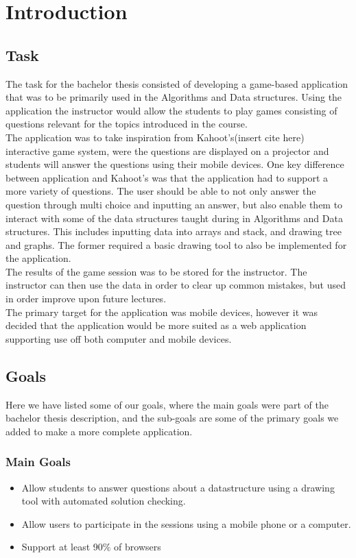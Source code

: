 \section{Introduction}
\subsection{Task}
The task for the bachelor thesis consisted of developing a game-based application that was to be primarily used in the Algorithms and Data structures. Using the application the instructor would allow the students to play games consisting of questions relevant for the topics introduced in the course.
\\[11pt]
The application was to take inspiration from Kahoot's(insert cite here) interactive game system, were the questions are displayed on a projector and students will answer the questions using their mobile devices. One key difference between application and Kahoot's was that the application had to support a more variety of questions. The user should be able to not only answer the question through multi choice and inputting an answer, but also enable them to interact with some of the data structures taught during in Algorithms and Data structures. This includes inputting data into arrays and stack, and drawing tree and graphs. The former required a basic drawing tool to also be implemented for the application.
\\[11pt] 
The results of the game session was to be stored for the instructor. The instructor can then use the data in order to clear up common mistakes, but used in order improve upon future lectures.
\\[11pt]
The primary target for the application was mobile devices, however it was decided that the application would be more suited as a web application supporting use off both computer and mobile devices. 

\subsection{Goals}
Here we have listed some of our goals, where the main goals were part of the bachelor thesis description, and the sub-goals are some of the primary goals we added to make a more complete application.
\subsubsection{Main Goals}
\begin{itemize}
\item Allow students to answer questions about a datastructure using a drawing tool with automated solution checking.
\item Allow users to participate in the sessions using a mobile phone or a computer.
\item Support at least 90\% of browsers
\end{itemize}
